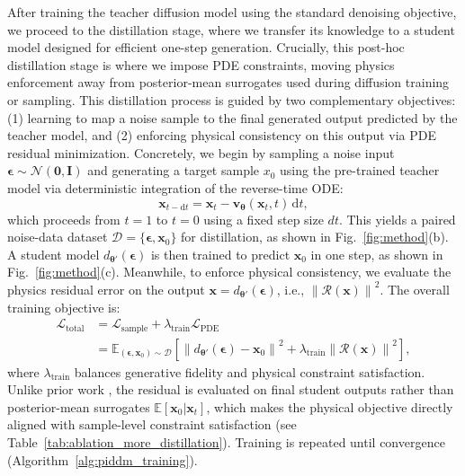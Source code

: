 \documentclass{article}
\theoremstyle{plain}
\theoremstyle{definition}
\theoremstyle{remark}
\def\vv{{\bm{v}}}
\def\vx{{\bm{x}}}
\begin{document}
After training the teacher diffusion model using the standard denoising objective, we proceed to the distillation stage, where we transfer its knowledge to a student model designed for efficient one-step generation. Crucially, this post-hoc distillation stage is where we impose PDE constraints, moving physics enforcement away from posterior-mean surrogates used during diffusion training or sampling. This distillation process is guided by two complementary objectives: (1) learning to map a noise sample to the final generated output predicted by the teacher model, and (2) enforcing physical consistency on this output via PDE residual minimization. Concretely, we begin by sampling a noise input $\bm \epsilon \sim \mathcal{N}(\bm 0, \bm{I})$ and generating a target sample $x_0$ using the pre-trained teacher model via deterministic integration of the reverse-time ODE:
\begin{equation}
\vx_{t-\mathrm{d}t} = \vx_{t} - \vv_{\boldsymbol{\theta}}(\vx_{t}, t)\,\mathrm{d}t,
\end{equation}
which proceeds from $t=1$ to $t=0$ using a fixed step size $dt$. This yields a paired noise-data dataset $\mathcal{D}=\{\boldsymbol{\epsilon},\vx_0\}$ for distillation, as shown in Fig.~\ref{fig:method}(b). A student model $d_{\boldsymbol{\theta}'}(\boldsymbol{\epsilon})$ is then trained to predict $\vx_0$ in one step, as shown in Fig.~\ref{fig:method}(c). Meanwhile, to enforce physical consistency, we evaluate the physics residual error on the output $\vx = d_{\boldsymbol{\theta}'}(\bm \epsilon)$, i.e., $\left\|\mathcal{R}(\vx)\right\|^2$. The overall training objective is:
\begin{equation}\label{eq:distillation_loss}
\begin{aligned}
\mathcal{L}_{\text{total}} & = \mathcal{L}_{\text{sample}} + \lambda_{\text{train}} \mathcal{L}_{\text{PDE}}  \\
& =\mathbb{E}_{(\boldsymbol{\epsilon},\vx_0)\sim \mathcal{D}} \left[\left\| d_{\boldsymbol{\theta}'}(\boldsymbol{\epsilon}) - \vx_0 \right\|^2 + \lambda_{\text{train}}\left\| \mathcal{R}(\vx) \right\|^2\right],
\end{aligned}
\end{equation}
where $\lambda_{\text{train}}$ balances generative fidelity and physical constraint satisfaction. Unlike prior work \cite{bastek2025pdim, huang2024diffusionpde}, the residual is evaluated on final student outputs rather than posterior-mean surrogates $\mathbb{E}[\bm x_0 | \bm x_t]$, which makes the physical objective directly aligned with sample-level constraint satisfaction (see Table~\ref{tab:ablation_more_distillation}). Training is repeated until convergence (Algorithm~\ref{alg:piddm_training}).
\end{document}
